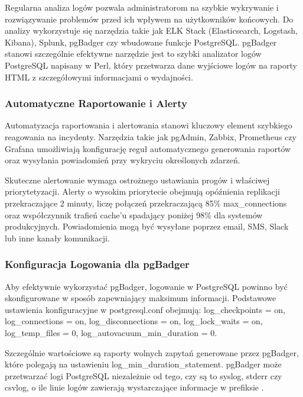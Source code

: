 \documentclass[letterpaper,10pt,polish]{sphinxmanual}
\begin{document}
\sphinxAtStartPar
Regularna analiza logów pozwala administratorom na szybkie wykrywanie i rozwiązywanie problemów przed ich wpływem na użytkowników końcowych. Do analizy wykorzystuje się narzędzia takie jak ELK Stack (Elasticsearch, Logstash, Kibana), Splunk, pgBadger czy wbudowane funkcje PostgreSQL. pgBadger stanowi szczególnie efektywne narzędzie \sphinxhyphen{} jest to szybki analizator logów PostgreSQL napisany w Perl, który przetwarza dane wyjściowe logów na raporty HTML z szczegółowymi informacjami o wydajności.


\subsubsection{Automatyczne Raportowanie i Alerty}
\label{\detokenize{rozdzial2/repo-wspolne/index:automatyczne-raportowanie-i-alerty}}
\sphinxAtStartPar
Automatyzacja raportowania i alertowania stanowi kluczowy element szybkiego reagowania na incydenty. Narzędzia takie jak pgAdmin, Zabbix, Prometheus czy Grafana umożliwiają konfigurację reguł automatycznego generowania raportów oraz wysyłania powiadomień przy wykryciu określonych zdarzeń.

\sphinxAtStartPar
Skuteczne alertowanie wymaga ostrożnego ustawiania progów i właściwej priorytetyzacji. Alerty o wysokim priorytecie obejmują opóźnienia replikacji przekraczające 2 minuty, liczę połączeń przekraczającą 85\% max\_connections oraz współczynnik trafień cache’u spadający poniżej 98\% dla systemów produkcyjnych. Powiadomienia mogą być wysyłane poprzez e\sphinxhyphen{}mail, SMS, Slack lub inne kanały komunikacji.


\subsubsection{Konfiguracja Logowania dla pgBadger}
\label{\detokenize{rozdzial2/repo-wspolne/index:konfiguracja-logowania-dla-pgbadger}}
\sphinxAtStartPar
Aby efektywnie wykorzystać pgBadger, logowanie w PostgreSQL powinno być skonfigurowane w sposób zapewniający maksimum informacji. Podstawowe ustawienia konfiguracyjne w postgresql.conf obejmują: log\_checkpoints = on, log\_connections = on, log\_disconnections = on, log\_lock\_waits = on, log\_temp\_files = 0, log\_autovacuum\_min\_duration = 0.

\sphinxAtStartPar
Szczególnie wartościowe są raporty wolnych zapytań generowane przez pgBadger, które polegają na ustawieniu log\_min\_duration\_statement. pgBadger może przetwarzać logi PostgreSQL niezależnie od tego, czy są to syslog, stderr czy csvlog, o ile linie logów zawierają wystarczające informacje w prefiksie .
\end{document}
